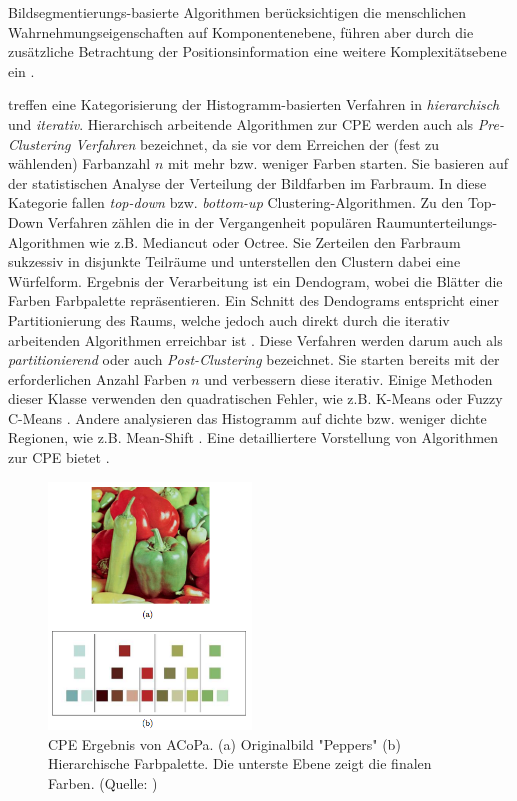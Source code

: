 \documentclass[11pt, bibliography=totoc]{scrartcl}
\begin{document}
Bildsegmentierungs-basierte Algorithmen berücksichtigen die menschlichen Wahrnehmungseigenschaften auf Komponentenebene, führen aber durch die zusätzliche Betrachtung der Positionsinformation eine weitere Komplexitätsebene ein \citep{colorthemes}.

\citet{categorization} treffen eine Kategorisierung der Histogramm-basierten Verfahren in \emph{hierarchisch} und \emph{iterativ}. Hierarchisch arbeitende Algorithmen zur CPE werden auch als \emph{Pre-Clustering Verfahren} bezeichnet, da sie vor dem Erreichen der (fest zu wählenden) Farbanzahl $n$ mit mehr bzw. weniger Farben starten. Sie basieren auf der statistischen Analyse der Verteilung der Bildfarben im Farbraum. In diese Kategorie fallen \emph{top-down} bzw. \emph{bottom-up} Clustering-Algorithmen. Zu den Top-Down Verfahren zählen die in der Vergangenheit populären Raumunterteilungs-Algorithmen wie z.B. Mediancut \citep{mediancut} oder Octree\citep{octree}. Sie Zerteilen den Farbraum sukzessiv in disjunkte Teilräume und unterstellen den Clustern dabei eine Würfelform. Ergebnis der Verarbeitung ist ein Dendogram, wobei die Blätter die Farben Farbpalette repräsentieren. Ein Schnitt des Dendograms entspricht einer Partitionierung des Raums, welche jedoch auch direkt durch die iterativ arbeitenden Algorithmen erreichbar ist \citep{acopa}. Diese Verfahren werden darum auch als \emph{partitionierend} \citep{acopa} oder auch \emph{Post-Clustering} \citep{categorization} bezeichnet. Sie starten bereits mit der erforderlichen Anzahl Farben $n$ und verbessern diese iterativ. Einige Methoden dieser Klasse verwenden den quadratischen Fehler, wie z.B. K-Means \citep{kmeans, kmeanshsi} oder Fuzzy C-Means \citep{fuccycmeans}. Andere analysieren das Histogramm auf dichte bzw. weniger dichte Regionen, wie z.B. Mean-Shift \citep{meanshift}. Eine detailliertere Vorstellung von Algorithmen zur CPE bietet \citep{categorization2}.

\begin{figure}[h]
\centering
\includegraphics[width=0.48\textwidth]{img/peppers.png}
\caption{CPE Ergebnis von ACoPa. (a) Originalbild "Peppers" (b) Hierarchische Farbpalette. Die unterste Ebene zeigt die finalen Farben. (Quelle: \citep{acopa})}
\label{fig:peppers}
\end{figure}
\end{document}
